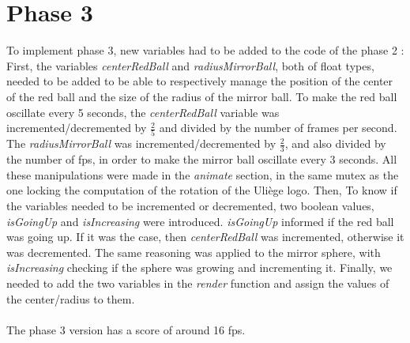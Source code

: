 \documentclass[a4paper, 11pt]{article}
\begin{document}
\section{Phase 3}
{\setlength{\parindent}{0pt}To implement phase 3, new variables had to be added to the code of the phase 2 :}
\newline\indent
First, the variables \textit{centerRedBall} and \textit{radiusMirrorBall}, both of float types, needed to be added to be able to respectively manage the position of the center of the red ball and the size of the radius of the mirror ball. To make the red ball oscillate every 5 seconds, the \textit{centerRedBall} variable was incremented/decremented by $\frac{2}{5}$ and divided by the number of frames per second. The \textit{radiusMirrorBall} was incremented/decremented by $\frac{2}{3}$, and also divided by the number of fps, in order to make the mirror ball oscillate every 3 seconds. All these manipulations were made in the \textit{animate} section, in the same mutex as the one locking the computation of the rotation of the Uliège logo.
\newline\indent
Then, To know if the variables needed to be incremented or decremented, two boolean values, \textit{isGoingUp} and \textit{isIncreasing} were introduced. \textit{isGoingUp} informed if the red ball was going up. If it was the case, then \textit{centerRedBall} was incremented, otherwise it was decremented. The same reasoning was applied to the mirror sphere, with \textit{isIncreasing} checking if the sphere was growing and incrementing it.
\newline\indent
Finally, we needed to add the two variables in the \textit{render} function and assign the values of the center/radius to them. 
\\
\\
The phase 3 version has a score of around 16 fps.
\end{document}
